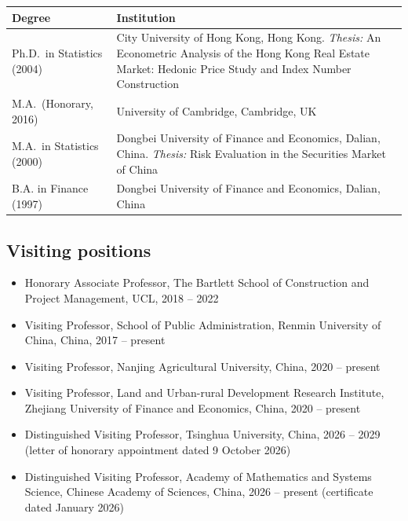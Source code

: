 \documentclass[11pt,a4paper]{article}
\providecommand{\tightlist}{%
  \setlength{\itemsep}{1pt}\setlength{\parskip}{0pt}}
\begin{document}
\begin{longtable}[]{@{}
  >{\raggedright\arraybackslash}p{}
  >{\raggedright\arraybackslash}p{}@{}}
\toprule\noalign{}
\begin{minipage}[b]{\linewidth}\raggedright
Degree
\end{minipage} & \begin{minipage}[b]{\linewidth}\raggedright
Institution
\end{minipage} \\
\midrule\noalign{}
\endhead
\bottomrule\noalign{}
\endlastfoot
Ph.D.~in Statistics (2004) & City University of Hong Kong, Hong Kong.
\emph{Thesis:} An Econometric Analysis of the Hong Kong Real Estate
Market: Hedonic Price Study and Index Number Construction \\
M.A.~(Honorary, 2016) & University of Cambridge, Cambridge, UK \\
M.A.~in Statistics (2000) & Dongbei University of Finance and Economics,
Dalian, China. \emph{Thesis:} Risk Evaluation in the Securities Market
of China \\
B.A. in Finance (1997) & Dongbei University of Finance and Economics,
Dalian, China \\
\end{longtable}

\subsection{Visiting positions}\label{visiting-positions}

\begin{itemize}
\tightlist
\item
  Honorary Associate Professor, The Bartlett School of Construction and
  Project Management, UCL, 2018 -- 2022
\item
  Visiting Professor, School of Public Administration, Renmin University
  of China, China, 2017 -- present
\item
  Visiting Professor, Nanjing Agricultural University, China, 2020 --
  present
\item
  Visiting Professor, Land and Urban-rural Development Research
  Institute, Zhejiang University of Finance and Economics, China, 2020
  -- present
\item
  Distinguished Visiting Professor, Tsinghua University, China, 2026 --
  2029 (letter of honorary appointment dated 9 October 2026)
\item
  Distinguished Visiting Professor, Academy of Mathematics and Systems
  Science, Chinese Academy of Sciences, China, 2026 -- present
  (certificate dated January 2026)
\end{itemize}
\end{document}
